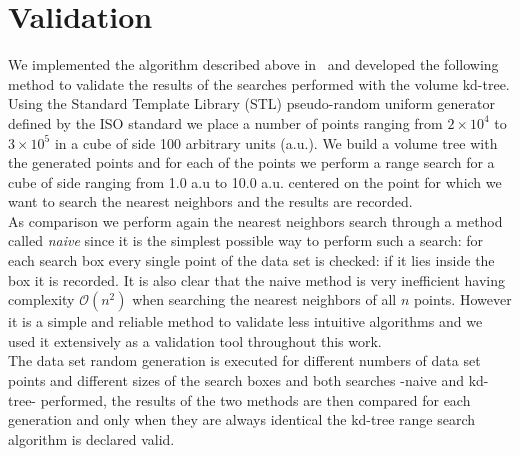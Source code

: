 \section{Validation}
We implemented the algorithm described above in \CC\ and developed the following method to validate the results of the searches performed with the volume kd-tree.\\
Using the Standard Template Library (STL) pseudo-random uniform generator defined by the  ISO standard we place a number of points ranging from $2 \times 10^{4}$ to $3 \times 10^{5}$ in a cube of side 100 arbitrary units (a.u.). We build a volume tree with the generated points and for each of the points we perform a range search for a cube of side ranging from 1.0 a.u to 10.0 a.u. centered on the point for which we want to search the nearest neighbors and the results are recorded.\\
As comparison we perform again the nearest neighbors search through a method called \textit{naive} since it is the simplest possible way to perform such a search: for each search box every single point of the data set is checked: if it lies inside the box it is recorded. It is also clear that the naive method is very inefficient having complexity $\mathcal{O}(n^{2})$ when searching the nearest neighbors of all $n$ points. However it is a simple and reliable method to validate less intuitive algorithms and we used it extensively as a validation tool throughout this work.\\
The data set random generation is executed for different numbers of data set points and different sizes of the search boxes and both searches -naive and kd-tree- performed, the results of the two methods are then compared for each generation and only when they are always identical the kd-tree range search algorithm is declared valid.

